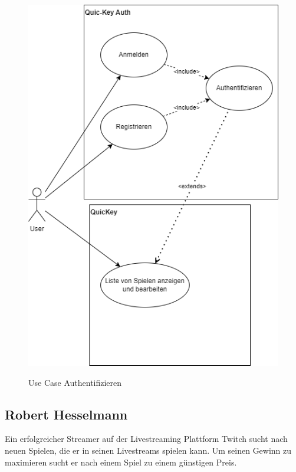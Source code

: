 \begin{figure}[hbt]
    \begin{minipage}[t]{.7\textwidth} %
        \caption{Use Case Authentifizieren} %
        \includegraphics[width=1\textwidth]{img/use_case_auth.png}\\ %
    \end{minipage}
\end{figure}
\newpage
\subsection*{Robert Hesselmann}

Ein erfolgreicher Streamer auf der Livestreaming Plattform Twitch sucht nach neuen Spielen, die er in seinen Livestreams spielen kann. Um seinen Gewinn zu maximieren sucht er nach einem Spiel zu einem günstigen Preis.

